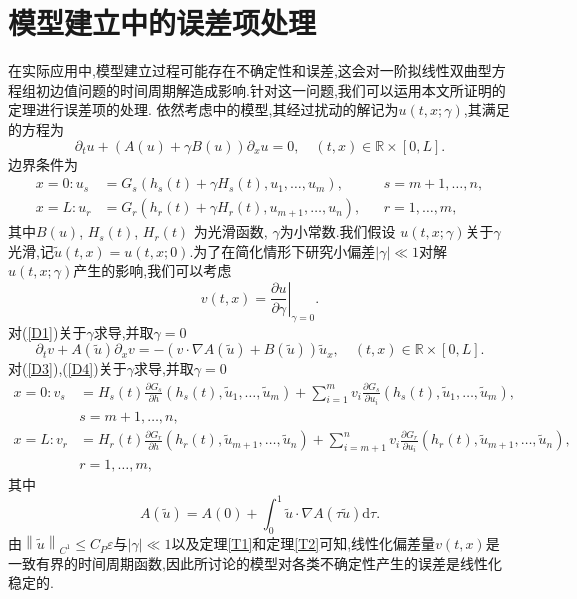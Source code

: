\documentclass[notitlepage,cs4size,punct,oneside]{ctexrep}
\numberwithin{equation}{chapter}
\theoremstyle{mystyle}
\begin{document}
\section{模型建立中的误差项处理}
在实际应用中,模型建立过程可能存在不确定性和误差,这会对一阶拟线性双曲型方程组初边值问题的时间周期解造成影响.针对这一问题,我们可以运用本文所证明的定理进行误差项的处理.
依然考虑\cite{24}中的模型,其经过扰动的解记为$u(t,x;\gamma )$,其满足的方程为
\begin{equation} \label{D1}
    \partial_{t} u+\left( A(u) + \gamma B(u) \right) \partial_{x} u=0, \quad(t, x) \in \mathbb{R} \times[0, L].
\end{equation}
边界条件为
\begin{align}
    x=0: u_{s} & =G_{s}\left(h_{s}(t) + \gamma H_{s}(t), u_{1}, \ldots, u_{m}\right),     &  & s=m+1, \ldots, n,  \label{D3} \\
    x=L: u_{r} & =G_{r}\left(h_{r}(t) +  \gamma H_{r}(t), u_{m+1}, \ldots, u_{n}\right) , &  & r=1, \ldots, m,\label{D4}
\end{align}
其中$B(u)$,   $H_{s}(t)$,  $H_{r}(t)$ 为光滑函数, $\gamma $为小常数.我们假设 $u(t,x;\gamma )$关于$\gamma $光滑,记$\tilde{u}(t,x)=u(t,x;0)$.为了在简化情形下研究小偏差$|\gamma| \ll 1$对解$u(t,x;\gamma)$产生的影响,我们可以考虑
\begin{equation}
    v(t,x) = \left. \frac{\partial u}{\partial \gamma } \right|_{\gamma =0}.
\end{equation}
对(\ref{D1})关于$\gamma $求导,并取$\gamma=0$
\begin{equation} \label{D2}
    \partial_{t} v+A(\tilde{u})  \partial_{x} v=- \left(v \cdot \nabla A(\tilde{u})+B(\tilde{u}) \right) \tilde{u}_x, \quad(t, x) \in \mathbb{R} \times[0, L].
\end{equation}
对(\ref{D3}),(\ref{D4})关于$\gamma $求导,并取$\gamma=0$
\begin{align}
    x=0: v_{s} & =H_{s}(t) \frac{\partial G_{s}}{\partial h} \left(h_{s}(t), \tilde{u}_{1}, \ldots, \tilde{u}_{m}\right) + \sum_{i=1}^{m} v_{i} \frac{\partial G_{s}}{\partial u_{i} }\left(h_{s}(t), \tilde{u}_{1}, \ldots, \tilde{u}_{m}\right),\nonumber     \\& s=m+1, \ldots, n,  \label{D5} \\
    x=L: v_{r} & =H_{r}(t)\frac{\partial G_{r}}{\partial h} \left(h_{r}(t), \tilde{u}_{m+1}, \ldots, \tilde{u}_{n}\right) + \sum_{i=m+1}^{n} v_{i} \frac{\partial G_{r}}{\partial u_{i}}\left(h_{r}(t), \tilde{u}_{m+1}, \ldots, \tilde{u}_{n}\right),\nonumber \\&r=1, \ldots, m,\label{D6}
\end{align}
其中
\begin{equation}
    A(\tilde{u})= A(0) + \int_{0}^{1} \tilde{u} \cdot \nabla A(\tau \tilde{u}) \mathrm{d}\tau .
\end{equation}
由$\left\| \tilde{u} \right\|_{C^{1}} \leq C_{P} \varepsilon $与$|\gamma| \ll 1$以及定理\ref{T1}和定理\ref{T2}可知,线性化偏差量$v(t,x)$是一致有界的时间周期函数,因此\cite{24}所讨论的模型对各类不确定性产生的误差是线性化稳定的.
\end{document}
